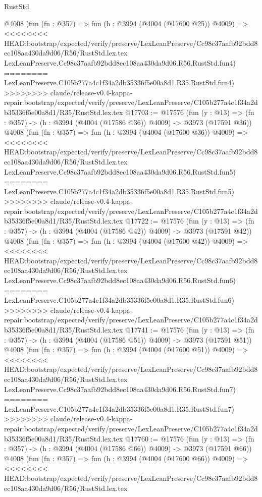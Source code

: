 \begin{lexlean}{RustStd}
\begin{coremodule}
{\begin{coremodule}
{{{{{{{{{{{{{{{{    @4008
    (fun (fn : @357) =>
    fun (h : @3994 (@4004 (@17600 @25)) @4009) =>
<<<<<<<< HEAD:bootstrap/expected/verify/preserve/LexLeanPreserve/Cc98c37aafb92bdd8ec108aa430da9d06/R56/RustStd.lex.tex
    LexLeanPreserve.Cc98c37aafb92bdd8ec108aa430da9d06.R56.RustStd.fun4)
========
    LexLeanPreserve.C105b277a4c1f34a2db35336f5e00a8d1.R35.RustStd.fun4)
>>>>>>>> claude/release-v0.4-kappa-repair:bootstrap/expected/verify/preserve/LexLeanPreserve/C105b277a4c1f34a2db35336f5e00a8d1/R35/RustStd.lex.tex
@17703 := @17576
    (fun (y : @13) => (fn : @357) -> (h : @3994 (@4004 (@17586 @36)) @4009) -> @3973 (@17591 @36))
    @4008
    (fun (fn : @357) =>
    fun (h : @3994 (@4004 (@17600 @36)) @4009) =>
<<<<<<<< HEAD:bootstrap/expected/verify/preserve/LexLeanPreserve/Cc98c37aafb92bdd8ec108aa430da9d06/R56/RustStd.lex.tex
    LexLeanPreserve.Cc98c37aafb92bdd8ec108aa430da9d06.R56.RustStd.fun5)
========
    LexLeanPreserve.C105b277a4c1f34a2db35336f5e00a8d1.R35.RustStd.fun5)
>>>>>>>> claude/release-v0.4-kappa-repair:bootstrap/expected/verify/preserve/LexLeanPreserve/C105b277a4c1f34a2db35336f5e00a8d1/R35/RustStd.lex.tex
@17722 := @17576
    (fun (y : @13) => (fn : @357) -> (h : @3994 (@4004 (@17586 @42)) @4009) -> @3973 (@17591 @42))
    @4008
    (fun (fn : @357) =>
    fun (h : @3994 (@4004 (@17600 @42)) @4009) =>
<<<<<<<< HEAD:bootstrap/expected/verify/preserve/LexLeanPreserve/Cc98c37aafb92bdd8ec108aa430da9d06/R56/RustStd.lex.tex
    LexLeanPreserve.Cc98c37aafb92bdd8ec108aa430da9d06.R56.RustStd.fun6)
========
    LexLeanPreserve.C105b277a4c1f34a2db35336f5e00a8d1.R35.RustStd.fun6)
>>>>>>>> claude/release-v0.4-kappa-repair:bootstrap/expected/verify/preserve/LexLeanPreserve/C105b277a4c1f34a2db35336f5e00a8d1/R35/RustStd.lex.tex
@17741 := @17576
    (fun (y : @13) => (fn : @357) -> (h : @3994 (@4004 (@17586 @51)) @4009) -> @3973 (@17591 @51))
    @4008
    (fun (fn : @357) =>
    fun (h : @3994 (@4004 (@17600 @51)) @4009) =>
<<<<<<<< HEAD:bootstrap/expected/verify/preserve/LexLeanPreserve/Cc98c37aafb92bdd8ec108aa430da9d06/R56/RustStd.lex.tex
    LexLeanPreserve.Cc98c37aafb92bdd8ec108aa430da9d06.R56.RustStd.fun7)
========
    LexLeanPreserve.C105b277a4c1f34a2db35336f5e00a8d1.R35.RustStd.fun7)
>>>>>>>> claude/release-v0.4-kappa-repair:bootstrap/expected/verify/preserve/LexLeanPreserve/C105b277a4c1f34a2db35336f5e00a8d1/R35/RustStd.lex.tex
@17760 := @17576
    (fun (y : @13) => (fn : @357) -> (h : @3994 (@4004 (@17586 @66)) @4009) -> @3973 (@17591 @66))
    @4008
    (fun (fn : @357) =>
    fun (h : @3994 (@4004 (@17600 @66)) @4009) =>
<<<<<<<< HEAD:bootstrap/expected/verify/preserve/LexLeanPreserve/Cc98c37aafb92bdd8ec108aa430da9d06/R56/RustStd.lex.tex
}}}}}}}}}}}}}}}}
\end{coremodule}}
\end{coremodule}
\end{lexlean}
